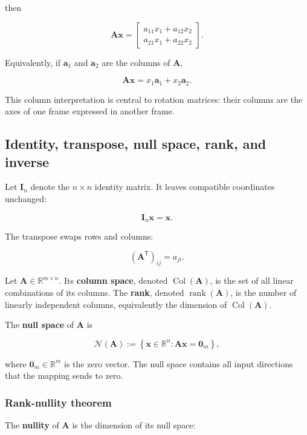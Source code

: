 \documentclass[
  australian,
  12pt,
  letterpaper,
  DIV=11,
  numbers=noendperiod,
  twoside]{scrreprt}
\begin{document}
then

\[
\mathbf{A}\mathbf{x}
=
\begin{bmatrix}
a_{11}x_1+a_{12}x_2\\
a_{21}x_1+a_{22}x_2
\end{bmatrix}.
\]

Equivalently, if \(\mathbf{a}_1\) and \(\mathbf{a}_2\) are the columns
of \(\mathbf{A}\),

\[
\mathbf{A}\mathbf{x}=x_1\mathbf{a}_1+x_2\mathbf{a}_2.
\]

This column interpretation is central to rotation matrices: their
columns are the axes of one frame expressed in another frame.

\subsection{Identity, transpose, null space, rank, and
inverse}\label{identity-transpose-null-space-rank-and-inverse}

Let \(\mathbf{I}_n\) denote the \(n\times n\) identity matrix. It leaves
compatible coordinates unchanged:

\[
\mathbf{I}_n\mathbf{x}=\mathbf{x}.
\]

The transpose swaps rows and columns:

\[
\left(\mathbf{A}^\mathsf{T}\right)_{ij}=a_{ji}.
\]

Let \(\mathbf A\in\mathbb R^{m\times n}\). Its \textbf{column space},
denoted \(\operatorname{Col}(\mathbf A)\), is the set of all linear
combinations of its columns. The \textbf{rank}, denoted
\(\operatorname{rank}(\mathbf A)\), is the number of linearly
independent columns, equivalently the dimension of
\(\operatorname{Col}(\mathbf A)\).

The \textbf{null space} of \(\mathbf A\) is

\[
\mathcal N(\mathbf A)
\mathrel{:=}
\left\{\mathbf x\in\mathbb R^n:\mathbf A\mathbf x=\mathbf 0_m\right\},
\]

where \(\mathbf 0_m\in\mathbb R^m\) is the zero vector. The null space
contains all input directions that the mapping sends to zero.

\subsubsection{Rank-nullity
theorem}\label{sec-linear-algebra-rank-nullity}

The \textbf{nullity} of \(\mathbf A\) is the dimension of its null
space:
\end{document}

